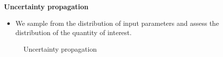 \begin{frame}\begin{center}
		\LARGE\textbf{Uncertainty propagation}
\end{center}\end{frame}
\begin{frame}
  \begin{itemize}
    \item We sample from the distribution of input parameters and assess the distribution of the quantity of interest.
  \end{itemize}
\end{frame}
\begin{frame}
\begin{figure}[htp]\centering\caption{Uncertainty propagation}
\end{figure}
\end{frame}
